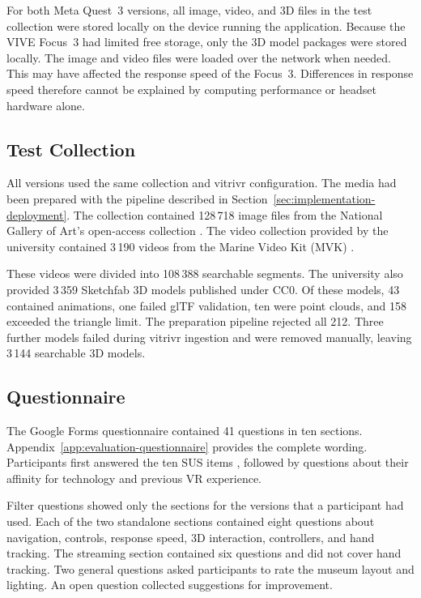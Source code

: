 For both Meta Quest~3 versions, all image, video, and 3D files in the test collection were stored locally on the device running the application. Because the VIVE Focus~3 had limited free storage, only the 3D model packages were stored locally. The image and video files were loaded over the network when needed. This may have affected the response speed of the Focus~3. Differences in response speed therefore cannot be explained by computing performance or headset hardware alone.

\subsection{Test Collection}

All versions used the same collection and vitrivr configuration. The media had been prepared with the pipeline described in Section~\ref{sec:implementation-deployment}. The collection contained 128\,718 image files from the National Gallery of Art's open-access collection \citep{nationalGalleryOpenAccess2026}. The video collection provided by the university contained 3\,190 videos from the Marine Video Kit (MVK) \citep{truong2023mvk}.

These videos were divided into 108\,388 searchable segments. The university also provided 3\,359 Sketchfab 3D models published under CC0. Of these models, 43 contained animations, one failed glTF validation, ten were point clouds, and 158 exceeded the triangle limit. The preparation pipeline rejected all 212. Three further models failed during vitrivr ingestion and were removed manually, leaving 3\,144 searchable 3D models.

\subsection{Questionnaire}

The Google Forms questionnaire contained 41 questions in ten sections. Appendix~\ref{app:evaluation-questionnaire} provides the complete wording. Participants first answered the ten SUS items \citep{brooke1996sus}, followed by questions about their affinity for technology and previous VR experience.

Filter questions showed only the sections for the versions that a participant had used. Each of the two standalone sections contained eight questions about navigation, controls, response speed, 3D interaction, controllers, and hand tracking. The streaming section contained six questions and did not cover hand tracking. Two general questions asked participants to rate the museum layout and lighting. An open question collected suggestions for improvement.


